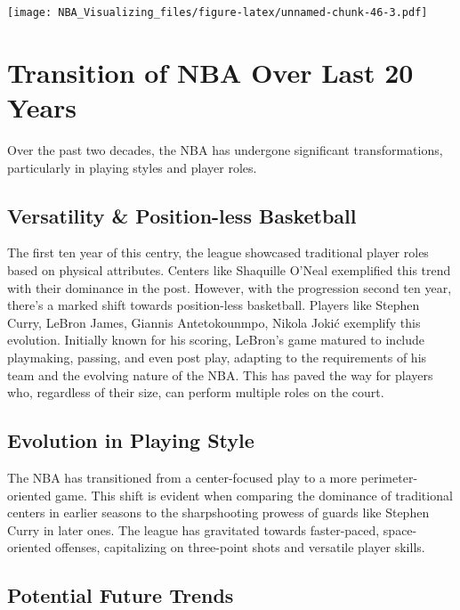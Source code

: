 \documentclass[
]{book}
\begin{document}
\texttt{[image: NBA\_Visualizing\_files/figure-latex/unnamed-chunk-46-3.pdf]}

\hypertarget{transition-of-nba-over-last-20-years}{%
\chapter{Transition of NBA Over Last 20 Years}\label{transition-of-nba-over-last-20-years}}

Over the past two decades, the NBA has undergone significant transformations, particularly in playing styles and player roles.

\hypertarget{versatility-position-less-basketball}{%
\section{Versatility \& Position-less Basketball}\label{versatility-position-less-basketball}}

The first ten year of this centry, the league showcased traditional player roles based on physical attributes. Centers like Shaquille O'Neal exemplified this trend with their dominance in the post. However, with the progression second ten year, there's a marked shift towards position-less basketball. Players like Stephen Curry, LeBron James, Giannis Antetokounmpo, Nikola Jokić exemplify this evolution. Initially known for his scoring, LeBron's game matured to include playmaking, passing, and even post play, adapting to the requirements of his team and the evolving nature of the NBA. This has paved the way for players who, regardless of their size, can perform multiple roles on the court.

\hypertarget{evolution-in-playing-style}{%
\section{Evolution in Playing Style}\label{evolution-in-playing-style}}

The NBA has transitioned from a center-focused play to a more perimeter-oriented game. This shift is evident when comparing the dominance of traditional centers in earlier seasons to the sharpshooting prowess of guards like Stephen Curry in later ones. The league has gravitated towards faster-paced, space-oriented offenses, capitalizing on three-point shots and versatile player skills.

\hypertarget{potential-future-trends}{%
\section{Potential Future Trends}\label{potential-future-trends}}
\end{document}
